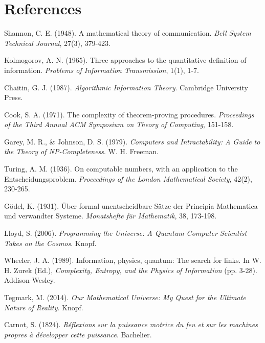 \documentclass[12pt,a4paper]{article}
\begin{document}
\section{References}



\begin{thebibliography}{99}

Shannon, C. E. (1948). A mathematical theory of communication. \textit{Bell System Technical Journal}, 27(3), 379-423.

Kolmogorov, A. N. (1965). Three approaches to the quantitative definition of information. \textit{Problems of Information Transmission}, 1(1), 1-7.

Chaitin, G. J. (1987). \textit{Algorithmic Information Theory}. Cambridge University Press.

Cook, S. A. (1971). The complexity of theorem-proving procedures. \textit{Proceedings of the Third Annual ACM Symposium on Theory of Computing}, 151-158.

Garey, M. R., \& Johnson, D. S. (1979). \textit{Computers and Intractability: A Guide to the Theory of NP-Completeness}. W. H. Freeman.

Turing, A. M. (1936). On computable numbers, with an application to the Entscheidungsproblem. \textit{Proceedings of the London Mathematical Society}, 42(2), 230-265.

Gödel, K. (1931). Über formal unentscheidbare Sätze der Principia Mathematica und verwandter Systeme. \textit{Monatshefte für Mathematik}, 38, 173-198.

Lloyd, S. (2006). \textit{Programming the Universe: A Quantum Computer Scientist Takes on the Cosmos}. Knopf.

Wheeler, J. A. (1989). Information, physics, quantum: The search for links. In W. H. Zurek (Ed.), \textit{Complexity, Entropy, and the Physics of Information} (pp. 3-28). Addison-Wesley.

Tegmark, M. (2014). \textit{Our Mathematical Universe: My Quest for the Ultimate Nature of Reality}. Knopf.

Carnot, S. (1824). \textit{Réflexions sur la puissance motrice du feu et sur les machines propres à développer cette puissance}. Bachelier.


\end{thebibliography}
\end{document}
